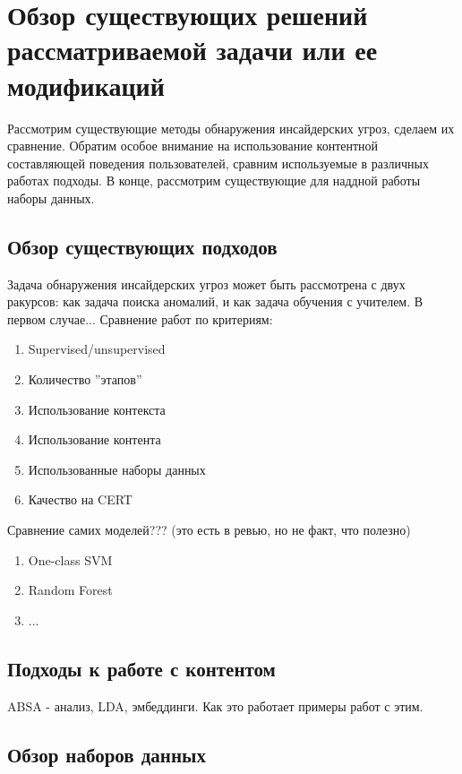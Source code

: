 \section{Обзор существующих решений рассматриваемой зада­чи или ее модификаций}
Рассмотрим существующие методы обнаружения инсайдерских угроз, сделаем их сравнение. Обратим особое внимание на использование контентной составляющей поведения пользователей, сравним используемые в различных работах подходы. В конце, рассмотрим существующие для наддной работы наборы данных.
\subsection{Обзор существующих подходов}
Задача обнаружения инсайдерских угроз может быть рассмотрена с двух ракурсов: как задача поиска аномалий, и как задача обучения с учителем.
В первом случае...
Сравнение работ по критериям:
\begin{enumerate}
\item Supervised/unsupervised
\item Количество ''этапов''
\item Использование контекста
\item Использование контента
\item Использованные наборы данных
\item Качество на CERT
\end{enumerate}
Сравнение самих моделей??? (это есть в ревью, но не факт, что полезно)
\begin{enumerate}
\item One-class SVM
\item Random Forest
\item ...
\end{enumerate}
\subsection{Подходы к работе с контентом}
ABSA - анализ, LDA, эмбеддинги. Как это работает примеры работ с этим.
\subsection{Обзор наборов данных}
\clearpage
